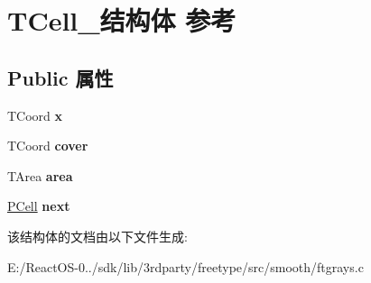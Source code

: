 \hypertarget{struct_t_cell__}{}\section{T\+Cell\+\_\+结构体 参考}
\label{struct_t_cell__}
\subsection*{Public 属性}
\begin{DoxyCompactItemize}
\item 
\mbox{\label{struct_t_cell___a4536703ce7d23bbaeec99a55524d142d}} 
T\+Coord {\bfseries x}
\item 
\mbox{\label{struct_t_cell___a28686cf9daed2749bd5a6efda14a9843}} 
T\+Coord {\bfseries cover}
\item 
\mbox{\label{struct_t_cell___af7ad708f810a148a0303bb851f82fe7b}} 
T\+Area {\bfseries area}
\item 
\mbox{\label{struct_t_cell___a2b668ed32d6a79702931eb7f78f4b2d6}} 
\hyperlink{struct_t_cell__}{P\+Cell} {\bfseries next}
\end{DoxyCompactItemize}


该结构体的文档由以下文件生成\+:\begin{DoxyCompactItemize}
\item 
E\+:/\+React\+O\+S-\/0../sdk/lib/3rdparty/freetype/src/smooth/ftgrays.\+c\end{DoxyCompactItemize}
